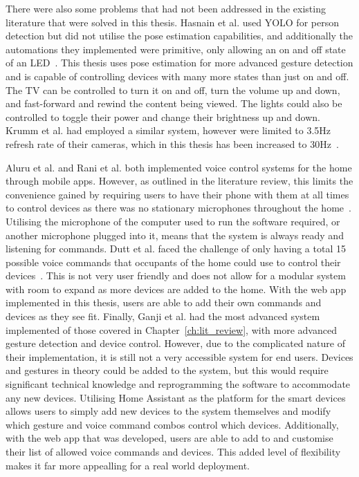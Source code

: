 There were also some problems that had not been addressed in the existing literature that were solved in this thesis.
Hasnain et al. used YOLO for person detection but did not utilise the pose estimation capabilities, and additionally the automations they implemented were primitive, only allowing an on and off state of an LED~\cite{Hasn19}.
This thesis uses pose estimation for more advanced gesture detection and is capable of controlling devices with many more states than just on and off.
The TV can be controlled to turn it on and off, turn the volume up and down, and fast-forward and rewind the content being viewed.
The lights could also be controlled to toggle their power and change their brightness up and down.
Krumm et al. had employed a similar system, however were limited to 3.5Hz refresh rate of their cameras, which in this thesis has been increased to 30Hz~\cite{Krum00}.

Aluru et al. and Rani et al. both implemented voice control systems for the home through mobile apps.
However, as outlined in the literature review, this limits the convenience gained by requiring users to have their phone with them at all times to control devices as there was no stationary microphones throughout the home~\cite{Alur21,Rani17}.
Utilising the microphone of the computer used to run the software required, or another microphone plugged into it, means that the system is always ready and listening for commands.
Dutt et al. faced the challenge of only having a total 15 possible voice commands that occupants of the home could use to control their devices~\cite{Dutt20}.
This is not very user friendly and does not allow for a modular system with room to expand as more devices are added to the home.
With the web app implemented in this thesis, users are able to add their own commands and devices as they see fit. 
Finally, Ganji et al. had the most advanced system implemented of those covered in Chapter~\ref{ch:lit_review}, with more advanced gesture detection and device control.
However, due to the complicated nature of their implementation, it is still not a very accessible system for end users.
Devices and gestures in theory could be added to the system, but this would require significant technical knowledge and reprogramming the software to accommodate any new devices.
Utilising Home Assistant as the platform for the smart devices allows users to simply add new devices to the system themselves and modify which gesture and voice command combos control which devices.
Additionally, with the web app that was developed, users are able to add to and customise their list of allowed voice commands and devices.
This added level of flexibility makes it far more appealling for a real world deployment.

